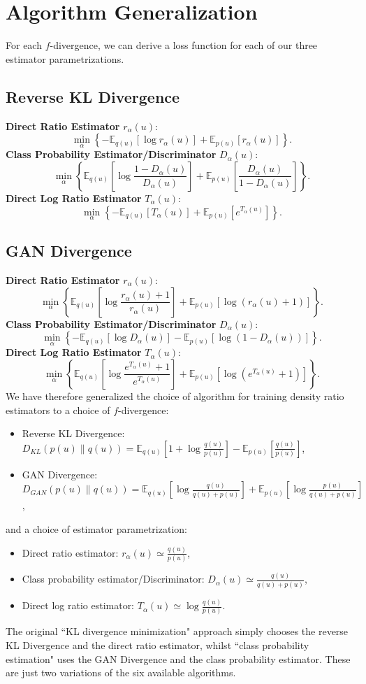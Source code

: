 \documentclass[honours,12pt, twoside]{unswthesis}
\newcommand{\E}{\mathbb{E}}
\numberwithin{equation}{section}
\theoremstyle{definition}
\begin{document}
\section{Algorithm Generalization}
For each $f$-divergence, we can derive a loss function for each of our three estimator parametrizations.
\subsection{Reverse KL Divergence}
\textbf{Direct Ratio Estimator} $r_\alpha(u)$:
\[\min_\alpha \left\lbrace-\mathbb{E}_{q(u)}[\log r_\alpha(u)]+\mathbb{E}_{p(u)}[r_\alpha(u)]\right\rbrace.\]
\textbf{Class Probability Estimator/Discriminator} $D_\alpha(u)$:
\[\min_\alpha \left\lbrace\mathbb{E}_{q(u)}\left[\log \frac{1-D_\alpha(u)}{D_\alpha(u)}\right]+\mathbb{E}_{p(u)}\left[\frac{D_\alpha(u)}{1-D_\alpha(u)}\right]\right\rbrace.\]
\textbf{Direct Log Ratio Estimator} $T_\alpha(u)$:
\[\min_\alpha \left\lbrace-\mathbb{E}_{q(u)}[T_\alpha(u)]+\mathbb{E}_{p(u)}\left[e^{T_\alpha (u)}\right]\right\rbrace.\]
\subsection{GAN Divergence}
\textbf{Direct Ratio Estimator} $r_\alpha(u)$:
\[\min_\alpha \left\lbrace\E_{q(u)}\left[\log \frac{r_\alpha(u)+1}{r_\alpha(u)}\right]+\E_{p(u)}[\log (r_\alpha(u)+1)]\right\rbrace.\]
\textbf{Class Probability Estimator/Discriminator} $D_\alpha(u)$:
\[\min_\alpha \left\lbrace-\E_{q(u)}[\log D_\alpha(u)]-\E_{p(u)}[\log (1-D_\alpha(u))]\right\rbrace.\]
\textbf{Direct Log Ratio Estimator} $T_\alpha(u)$:
\[\min_\alpha \left\lbrace\E_{q(u)}\left[\log \frac{e^{T_\alpha(u)}+1}{e^{T_\alpha(u)}}\right]+\E_{p(u)}\left[\log\left(e^{T_\alpha(u)}+1\right)\right]\right\rbrace.\]
We have therefore generalized the choice of algorithm for training density ratio estimators to a choice of $f$-divergence:
\begin{itemize}
\item Reverse KL Divergence: $D_{KL}(p(u)\|q(u))=\mathbb{E}_{q(u)}\left[1+\log \frac{q(u)}{p(u)}\right]-\mathbb{E}_{p(u)}\left[\frac{q(u)}{p(u)}\right]$,
\item GAN Divergence: $D_{GAN}(p(u)\|q(u))=\mathbb{E}_{q(u)}\left[\log \frac{q(u)}{q(u)+p(u)}\right]+\mathbb{E}_{p(u)}\left[\log \frac{p(u)}{q(u)+p(u)}\right]$,
\end{itemize}
and a choice of estimator parametrization:
\begin{itemize}
\item Direct ratio estimator: $r_\alpha(u)\simeq\frac{q(u)}{p(u)}$,
\item Class probability estimator/Discriminator: $D_\alpha(u)\simeq\frac{q(u)}{q(u)+p(u)}$,
\item Direct log ratio estimator: $T_\alpha(u)\simeq\log \frac{q(u)}{p(u)}.$
\end{itemize}
The original ``KL divergence minimization" approach simply chooses the reverse KL Divergence and the direct ratio estimator, whilst ``class probability estimation" uses the GAN Divergence and the class probability estimator. These are just two variations of the six available algorithms.
\end{document}
